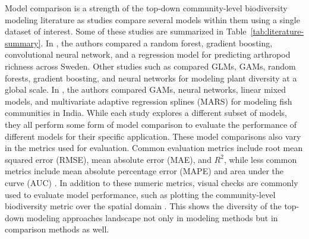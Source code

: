 Model comparison is a strength of the top-down community-level biodiversity modeling literature as studies compare several models within them using a single dataset of interest. Some of these studies are summarized in Table~\ref{tab:literature-summary}. In \cite{baggstrom2025}, the authors compared a random forest, gradient boosting, convolutional neural network, and a regression model for predicting arthropod richness across Sweden. Other studies such as \cite{cai2023} compared GLMs, GAMs, random forests, gradient boosting, and neural networks for modeling plant diversity at a global scale. In \cite{mondal2021}, the authors compared GAMs, neural networks, linear mixed models, and multivariate adaptive regression splines (MARS) for modeling fish communities in India. While each study explores a different subset of models, they all perform some form of model comparison to evaluate the performance of different models for their specific application. These model comparisons also vary in the metrics used for evaluation. Common evaluation metrics include root mean squared error (RMSE), mean absolute error (MAE), and \(R^2\), while less common metrics include mean absolute percentage error (MAPE) and area under the curve (AUC) \parencite{mondal2021, andermann2022, olaya-marin_comparison_2013, vecera_alpha_2019, cai2023, brugere2023, brun2024, baggstrom2025}. In addition to these numeric metrics, visual checks are commonly used to evaluate model performance, such as plotting the community-level biodiversity metric over the spatial domain \parencite{andermann2022, brugere2023, cai2023, brun2024, baggstrom2025}. This shows the diversity of the top-down modeling approaches landscape not only in modeling methods but in comparison methods as well.


